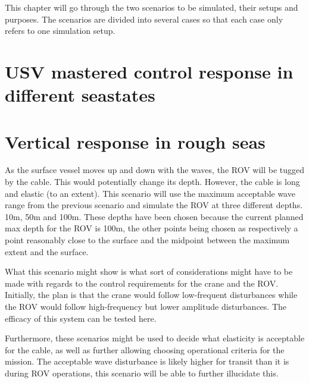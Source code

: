 \documentclass[class=article, crop=false, draft=true]{standalone}
\begin{document}
\label{chap:cases}
This chapter will go through the two scenarios to be simulated, their setups and purposes. The scenarios are divided into several cases so that each case only refers to one simulation setup.

\section{USV mastered control response in different seastates}


\section{Vertical response in rough seas}
As the surface vessel moves up and down with the waves, the ROV will be tugged by the cable. This would potentially change its depth. However, the cable is long and elastic (to an extent). This scenario will use the maximum acceptable wave range from the previous scenario and simulate the ROV at three different depths. 10m, 50m and 100m. These depths have been chosen because the current planned max depth for the ROV is 100m, the other points being chosen as respectively a point reasonably close to the surface and the midpoint between the maximum extent and the surface.

What this scenario might show is what sort of considerations might have to be made with regards to the control requirements for the crane and the ROV. Initially, the plan is that the crane would follow low-frequent disturbances while the ROV would follow high-frequency but lower amplitude disturbances. The efficacy of this system can be tested here.

Furthermore, these scenarios might be used to decide what elasticity is acceptable for the cable, as well as further allowing choosing operational criteria for the mission. The acceptable wave disturbance is likely higher for transit than it is during ROV operations, this scenario will be able to further illucidate this.
\end{document}

